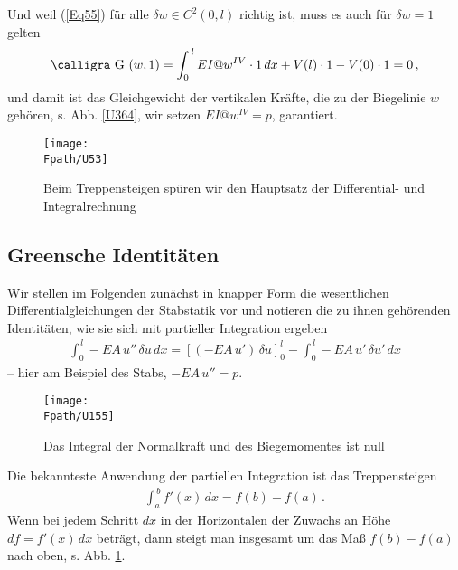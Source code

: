 {{{Und weil (\ref{Eq55}) f\"{u}r alle $\delta w \in C^2(0,l) $ richtig ist, muss es auch f\"{u}r $\delta w = 1$ gelten
\begin{align}
\text{\normalfont\calligra G\,\,}(w,1) = \int_0^{\,l} EI@w^{IV} \cdot 1 \,dx + V(l)\cdot 1 - V(0) \cdot 1= 0\,,
\end{align}
und damit ist das Gleichgewicht der vertikalen Kr\"{a}fte, die zu der Biegelinie $w $ geh\"{o}ren,  s. Abb. \ref{U364}, wir setzen $ EI@w^{IV} = p $, garantiert.

\begin{figure}[tbp]
\centering
\if {} \sidecaption \fi
\texttt{[image: \\Fpath/U53]}
\caption{Beim Treppensteigen sp\"{u}ren wir den Hauptsatz der Differential- und Integralrechnung} \label{U53}
%
\end{figure}%

{\textcolor{sectionTitleBlue}{\section{Greensche Identit\"{a}ten}}
Wir stellen im Folgenden zun\"{a}chst in knapper Form die wesentlichen Differentialgleichungen der Stabstatik vor und notieren die zu ihnen geh\"{o}renden  Identit\"{a}ten, wie sie sich mit partieller Integration ergeben
\begin{align}
\int_0^{\,l} - EA\,u''\,\delta u\,dx = [(- EA\,u')\,\delta u]_0^l - \int_0^{\,l} - EA\,u'\,\delta u'\,dx
\end{align}
-- hier am Beispiel des Stabs, $- EA\,u'' = p$.

\begin{figure}[tbp]
\centering
\if {} \sidecaption \fi
\texttt{[image: \\Fpath/U155]}
\caption{Das Integral der Normalkraft und des Biegemomentes ist null} \label{U155}
%
\end{figure}%


Die bekannteste Anwendung der partiellen Integration ist das Treppensteigen
\begin{align}\label{Eq83}
\int_a^{\,b} f'(x)\,dx = f(b) - f(a)\,.
\end{align}
Wenn bei jedem Schritt $dx$ in der Horizontalen der Zuwachs an H\"{o}he $df = f'(x)\,dx$ betr\"{a}gt, dann steigt man insgesamt um das Ma{\ss} $f(b) - f(a)$ nach oben, s. Abb. \ref{U53}.

}}}}
